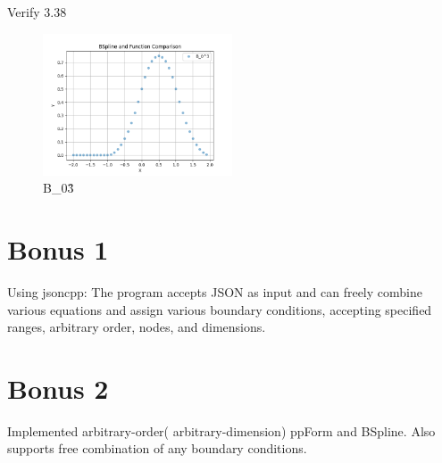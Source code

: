 \documentclass[a4paper]{article}
\begin{document}
Verify 3.38\\
\begin{figure}[H]
    \centering
    \includegraphics[width=0.5\textwidth]{../figure/PF_fig4.png}
    \caption{B\_0\^3}
\end{figure}

\section*{Bonus 1}
Using jsoncpp:
The program accepts JSON as input and can freely combine various equations and assign various boundary conditions, accepting specified ranges, arbitrary order, nodes, and dimensions.

\section*{Bonus 2}
Implemented arbitrary-order( arbitrary-dimension) ppForm and BSpline.
Also supports free combination of any boundary conditions.
\end{document}

